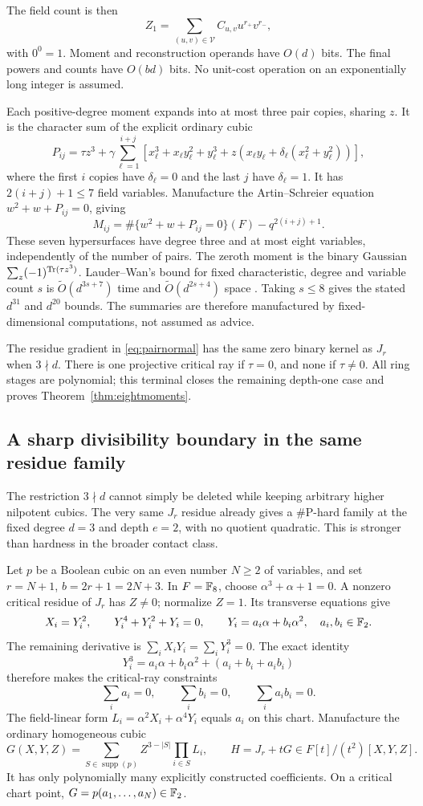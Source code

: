The field count is then
\[
 Z_1=\sum_{(u,v)\in\mathcal V}C_{u,v}u^{r_+}v^{r_-},
\]
with $0^0=1$. Moment and reconstruction operands have $O(d)$ bits.
The final powers and counts have $O(bd)$ bits. No unit-cost operation
on an exponentially long integer is assumed.

Each positive-degree moment expands into at most three pair copies,
sharing $z$. It is the character sum of the explicit ordinary cubic
\[
 P_{ij}=\tau z^3+\gamma\sum_{\ell=1}^{i+j}
 [x_\ell^3+x_\ell y_\ell^2+y_\ell^3+
 z(x_\ell y_\ell+\delta_\ell(x_\ell^2+y_\ell^2))],
\]
where the first $i$ copies have $\delta_\ell=0$ and the last $j$ have
$\delta_\ell=1$. It has $2(i+j)+1\le7$ field variables. Manufacture
the Artin--Schreier equation $w^2+w+P_{ij}=0$, giving
\[
 M_{ij}=\#\{w^2+w+P_{ij}=0\}(F)-q^{2(i+j)+1}.
\]
These seven hypersurfaces have degree three and at most eight variables,
independently of the number of pairs. The zeroth moment is the binary
Gaussian $\sum_z(-1)^{\operatorname{Tr}(\tau z^3)}$.
Lauder--Wan's bound for fixed characteristic, degree and variable count
$s$ is $\widetilde O(d^{3s+7})$ time and
$\widetilde O(d^{2s+4})$ space \cite{lauderwan}. Taking $s\le8$ gives
the stated $d^{31}$ and $d^{20}$ bounds. The summaries are therefore
manufactured by fixed-dimensional computations, not assumed as advice.

The residue gradient in \eqref{eq:pairnormal} has the same zero binary
kernel as $J_r$ when $3\nmid d$. There is one projective critical ray
if $\tau=0$, and none if $\tau\ne0$. All ring stages are polynomial;
this terminal closes the remaining depth-one case and proves
Theorem~\ref{thm:eightmoments}.

\subsection{A sharp divisibility boundary in the same residue family}
The restriction $3\nmid d$ cannot simply be deleted while keeping arbitrary
higher nilpotent cubics. The very same $J_r$ residue already gives a
\#P-hard family at the fixed degree $d=3$ and depth $e=2$, with no quotient
quadratic. This is stronger than hardness in the broader contact class.

Let $p$ be a Boolean cubic on an even number $N\ge2$ of variables, and set
$r=N+1$, $b=2r+1=2N+3$. In $F=\mathbb F_8$, choose
$\alpha^3+\alpha+1=0$. A nonzero critical residue of $J_r$ has $Z\ne0$;
normalize $Z=1$. Its transverse equations give
\[
 X_i=Y_i^2,\qquad Y_i^4+Y_i^2+Y_i=0,
 \qquad Y_i=a_i\alpha+b_i\alpha^2,\quad a_i,b_i\in\mathbb F_2.
\]
The remaining derivative is $\sum_iX_iY_i=\sum_iY_i^3=0$.
The exact identity
\[
 Y_i^3=a_i\alpha+b_i\alpha^2+(a_i+b_i+a_ib_i)
\]
therefore makes the critical-ray constraints
\[
 \sum_i a_i=0,\qquad \sum_i b_i=0,\qquad \sum_i a_ib_i=0.
\]
The field-linear form $L_i=\alpha^2X_i+\alpha^4Y_i$ equals $a_i$ on
this chart. Manufacture the ordinary homogeneous cubic
\[
 G(X,Y,Z)=\sum_{S\in\operatorname{supp}(p)}
 Z^{3-|S|}\prod_{i\in S}L_i,
 \qquad H=J_r+tG\in F[t]/(t^2)[X,Y,Z].
\]
It has only polynomially many explicitly constructed coefficients.
On a critical chart point, $G=p(a_1,\ldots,a_N)\in\mathbb F_2$.

